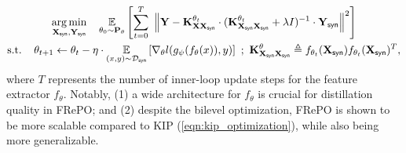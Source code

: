 \documentclass[10pt]{article} %
\begin{document}
\begin{equation} \label{eqn:frepo_optimization}
\begin{gathered}
    \underset{\mathbf{X}_{\mathsf{syn}}, \mathbf{Y}_{\mathsf{syn}}}{\operatorname{arg} \operatorname{min}} \hspace{0.4cm} 
    \underset{\theta_0 \sim \mathbf{P}_\theta}{\mathbb{E}} \left[\sum_{t=0}^T ~ \left\lVert \mathbf{Y} - \mathbf{K}^{\theta_t}_{\mathbf{X} \mathbf{X}_{\mathsf{syn}}} \cdot (\mathbf{K}^{\theta_t}_{\mathbf{X}_{\mathsf{syn}} \mathbf{X}_{\mathsf{syn}}} + \lambda I)^{-1} \cdot \mathbf{Y}_{\mathsf{syn}} \right\rVert^2\right] \\
    \text{s.t.} \hspace{0.4cm} \theta_{t+1} \leftarrow \theta_t - \eta \cdot \underset{(x, y) \sim \mathcal{D}_{\mathsf{syn}}}{\mathbb{E}} \left[\nabla_\theta l(g_{\psi}(f_{\theta}(x)), y)\right] ~;~ \mathbf{K}^{\theta}_{\mathbf{X}_{\mathsf{syn}} \mathbf{X}_{\mathsf{syn}}} \triangleq f_{\theta_t}(\mathbf{X}_{\mathsf{syn}}) f_{\theta_t}(\mathbf{X}_{\mathsf{syn}})^T,
\end{gathered}
\end{equation}
where $T$ represents the number of inner-loop update steps for the feature extractor $f_\theta$. Notably, (1) a wide architecture for $f_\theta$ is crucial for distillation quality in FRePO; and (2) despite the bilevel optimization, FRePO is shown to be more scalable compared to KIP (\cref{eqn:kip_optimization}), while also being more generalizable.
\end{document}
